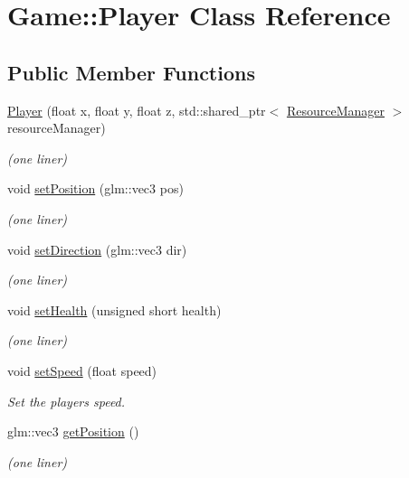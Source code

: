 \hypertarget{class_game_1_1_player}{}\section{Game\+:\+:Player Class Reference}
\label{class_game_1_1_player}
\subsection*{Public Member Functions}
\begin{DoxyCompactItemize}
\item 
\hyperlink{class_game_1_1_player_a0c4b6711ce532d961574843c990834f1}{Player} (float x, float y, float z, std\+::shared\+\_\+ptr$<$ \hyperlink{class_resource_manager}{Resource\+Manager} $>$ resource\+Manager)
\begin{DoxyCompactList}\small\item\em (one liner) \end{DoxyCompactList}\item 
void \hyperlink{class_game_1_1_player_a1379c0be9da9908da84b1fa99e268ece}{set\+Position} (glm\+::vec3 pos)
\begin{DoxyCompactList}\small\item\em (one liner) \end{DoxyCompactList}\item 
void \hyperlink{class_game_1_1_player_a0dc4a7db089a5659f97552c16c424c0d}{set\+Direction} (glm\+::vec3 dir)
\begin{DoxyCompactList}\small\item\em (one liner) \end{DoxyCompactList}\item 
void \hyperlink{class_game_1_1_player_a83a0058e7d3206735c1b27f00c0ae46f}{set\+Health} (unsigned short health)
\begin{DoxyCompactList}\small\item\em (one liner) \end{DoxyCompactList}\item 
void \hyperlink{class_game_1_1_player_a4d6b1f14903a69338b02a5621d350290}{set\+Speed} (float speed)
\begin{DoxyCompactList}\small\item\em Set the player\textquotesingle{}s speed. \end{DoxyCompactList}\item 
glm\+::vec3 \hyperlink{class_game_1_1_player_a5dd82979f9a5ac7bdd9e1244491d900f}{get\+Position} ()
\begin{DoxyCompactList}\small\item\em (one liner) \end{DoxyCompactList}\item 

\end{DoxyCompactItemize}
